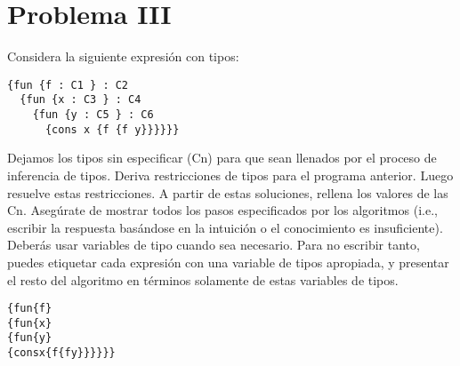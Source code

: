 \documentclass{article}
\begin{document}
  

\section*{Problema III}
Considera la siguiente expresión con tipos:

\begin{verbatim}
{fun {f : C1 } : C2
  {fun {x : C3 } : C4
    {fun {y : C5 } : C6
      {cons x {f {f y}}}}}}
\end{verbatim}

Dejamos los tipos sin especificar (Cn) para que sean llenados por el proceso
de inferencia de tipos. Deriva restricciones de tipos para el programa anterior.
Luego resuelve estas restricciones. A partir de estas soluciones, rellena los
valores de las Cn. Asegúrate de mostrar todos los pasos especificados por los
algoritmos (i.e., escribir la respuesta basándose en la intuición o el conocimiento
es insuficiente). Deberás usar variables de tipo cuando sea necesario.
Para no escribir tanto, puedes etiquetar cada expresión con una variable de tipos
apropiada, y presentar el resto del algoritmo en términos solamente de estas
variables de tipos.

\begin{alltt}
\{  fun \{f\}
  \{  fun \{x\}
    \{  fun \{y\}
      \{  cons  x   \{f  \{f y\}\}\}\}\}\}
\end{alltt}
\end{document}
